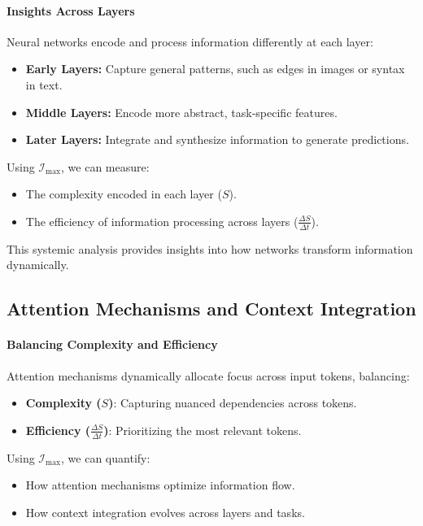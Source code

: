 \documentclass[12pt]{article}
\begin{document}
\paragraph{Insights Across Layers}
Neural networks encode and process information differently at each layer:
\begin{itemize}
    \item \textbf{Early Layers:} Capture general patterns, such as edges in images or syntax in text.
    \item \textbf{Middle Layers:} Encode more abstract, task-specific features.
    \item \textbf{Later Layers:} Integrate and synthesize information to generate predictions.
\end{itemize}
Using \(\mathcal{I}_{\text{max}}\), we can measure:
\begin{itemize}
    \item The complexity encoded in each layer (\(S\)).
    \item The efficiency of information processing across layers (\(\frac{\Delta S}{\Delta t}\)).
\end{itemize}
This systemic analysis provides insights into how networks transform information dynamically.

\subsection{Attention Mechanisms and Context Integration}

\paragraph{Balancing Complexity and Efficiency}
Attention mechanisms dynamically allocate focus across input tokens, balancing:
\begin{itemize}
    \item \textbf{Complexity (\(S\))}: Capturing nuanced dependencies across tokens.
    \item \textbf{Efficiency (\(\frac{\Delta S}{\Delta t}\))}: Prioritizing the most relevant tokens.
\end{itemize}
Using \(\mathcal{I}_{\text{max}}\), we can quantify:
\begin{itemize}
    \item How attention mechanisms optimize information flow.
    \item How context integration evolves across layers and tasks.
\end{itemize}
\end{document}
